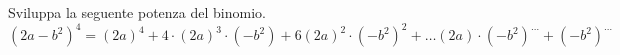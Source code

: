 \begin{esercizio}
\begin{multicols}{2}
\begin{enumeratea}
\end{enumeratea}
\end{multicols}
\end{esercizio}

\subsubsection*{}

\begin{esercizio}
 \label{ese:11.28}
 Sviluppa la seguente potenza del binomio.
 \[\left(2a-b^{2}\right)^{4}=\left(2a\right)^{4}+4\cdot
\left(2a\right)^{3}\cdot \left(-b^{2}\right)+6\left(2a\right)^{2}\cdot
\left(-b^{2}\right)^{2}+\ldots \left(2a\right)\cdot
\left(-b^{2}\right)^{\ldots }+\left(-b^{2}\right)^{\ldots }\]
\end{esercizio}

